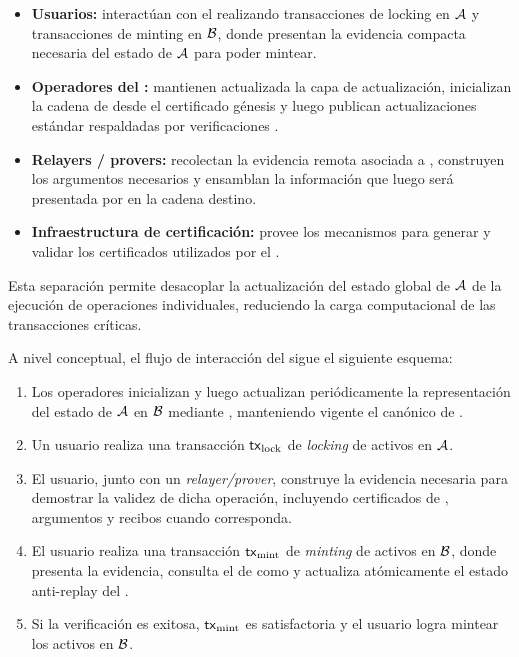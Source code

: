 \begin{itemize}[noitemsep]
		\item \textbf{Usuarios:} interactúan con el \Bridge realizando transacciones de locking en $\mathcal{A}$ y transacciones de minting en $\mathcal{B}$, donde presentan la evidencia compacta necesaria del estado de $\mathcal{A}$ para poder mintear.
		\item \textbf{Operadores del \Bridge:} mantienen actualizada la capa de actualización, inicializan la cadena de \StakeDistribution desde el certificado génesis y luego publican actualizaciones estándar respaldadas por verificaciones \STM.
	\item \textbf{Relayers / provers:} recolectan la evidencia remota asociada a \LockTx, construyen los argumentos \ZK necesarios y ensamblan la información que luego será presentada por \MintTx en la cadena destino.
		\item \textbf{Infraestructura de certificación:} provee los mecanismos para generar y validar los certificados utilizados por el \Bridge.
\end{itemize}

Esta separación permite desacoplar la actualización del estado global de $\mathcal{A}$ de la ejecución de operaciones individuales, reduciendo la carga computacional de las transacciones críticas.

A nivel conceptual, el flujo de interacción del \Bridge sigue el siguiente esquema:

\begin{enumerate}[noitemsep]
		\item Los operadores inicializan y luego actualizan periódicamente la representación del estado de $\mathcal{A}$ en $\mathcal{B}$ mediante \StakeDistTx, manteniendo vigente el \UTxO canónico de \StakeDistribution.
		\item Un usuario realiza una transacción $\mathsf{tx}_{\mathrm{lock}}$ de \textit{locking} de activos en $\mathcal{A}$.
		\item El usuario, junto con un \textit{relayer/prover}, construye la evidencia necesaria para demostrar la validez de dicha operación, incluyendo certificados de \TransactionSnapshot, argumentos \ZK y recibos \ProofReceipt cuando corresponda.
		\item El usuario realiza una transacción $\mathsf{tx}_{\mathrm{mint}}$ de \textit{minting} de activos en $\mathcal{B}$, donde presenta la evidencia, consulta el \UTxO de \StakeDistribution como \ReferenceInput y actualiza atómicamente el estado anti-replay del \Bridge.
		\item Si la verificación es exitosa, $\mathsf{tx}_{\mathrm{mint}}$ es satisfactoria y el usuario logra mintear los activos en $\mathcal{B}$.
\end{enumerate}

